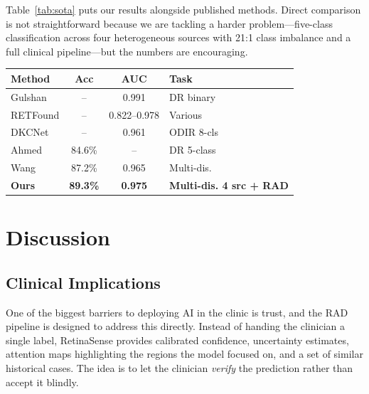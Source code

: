\documentclass[conference]{IEEEtran}
\begin{document}
Table~\ref{tab:sota} puts our results alongside published methods. Direct comparison is not straightforward because we are tackling a harder problem---five-class classification across four heterogeneous sources with 21:1 class imbalance and a full clinical pipeline---but the numbers are encouraging.

\vspace{0.5em}
\noindent
\begin{minipage}{\linewidth}
\centering
{}
\label{tab:sota}
\small
\begin{tabular}{lccp{1.6cm}}
\toprule
\textbf{Method} & \textbf{Acc} & \textbf{AUC} & \textbf{Task} \\
\midrule
Gulshan \cite{b3} & -- & 0.991 & DR binary \\
RETFound \cite{b22} & -- & 0.822--0.978 & Various \\
DKCNet \cite{b23} & -- & 0.961 & ODIR 8-cls \\
Ahmed \cite{b24} & 84.6\% & -- & DR 5-class \\
Wang \cite{b14} & 87.2\% & 0.965 & Multi-dis. \\
\midrule
\textbf{Ours} & \textbf{89.3\%} & \textbf{0.975} & \textbf{Multi-dis. 4 src + RAD} \\
\bottomrule
\end{tabular}
\end{minipage}
\vspace{0.5em}

\section{Discussion}

\subsection{Clinical Implications}

One of the biggest barriers to deploying AI in the clinic is trust, and the RAD pipeline is designed to address this directly. Instead of handing the clinician a single label, RetinaSense provides calibrated confidence, uncertainty estimates, attention maps highlighting the regions the model focused on, and a set of similar historical cases. The idea is to let the clinician \textit{verify} the prediction rather than accept it blindly.
\end{document}
